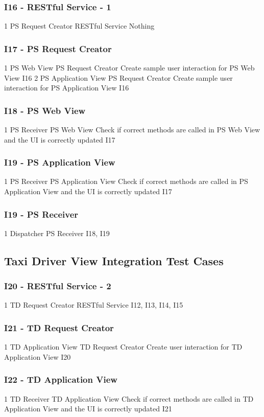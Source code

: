 \subsubsection{I16 - RESTful Service - 1}
\testCaseSimpleSimple
	{1}
	{PS Request Creator}
	{RESTful Service}
	{Nothing}
\subsubsection{I17 - PS Request Creator}
\testCaseSimple
	{1}
	{PS Web View}
	{PS Request Creator}
	{Create sample user interaction for PS Web View}
	{I16}
\testCaseSimple
	{2}
	{PS Application View}
	{PS Request Creator}
	{Create sample user interaction for PS Application View}	
	{I16}
\subsubsection{I18 - PS Web View}
\testCaseSimplee
	{1}
	{PS Receiver}
	{PS Web View}
	{Check if correct methods are called in PS Web View and the UI is correctly updated}
	{I17}
\subsubsection{I19 - PS Application View}
\testCaseSimplee
	{1}
	{PS Receiver}
	{PS Application View}
	{Check if correct methods are called in PS Application View and the UI is correctly updated}
	{I17}
\subsubsection{I19 - PS Receiver}
\testCaseSimpleSimple
	{1}
	{Dispatcher}
	{PS Receiver}
	{I18, I19}
\subsection{Taxi Driver View Integration Test Cases}
\subsubsection{I20 - RESTful Service - 2}
\testCaseSimpleSimple
	{1}
	{TD Request Creator}
	{RESTful Service}
	{I12, I13, I14, I15}
\subsubsection{I21 - TD Request Creator}
\testCaseSimple
	{1}
	{TD Application View}
	{TD Request Creator}
	{Create user interaction for TD Application View}
	{I20}
\subsubsection{I22 - TD Application View}
\testCaseSimplee
	{1}
	{TD Receiver}
	{TD Application View}
	{Check if correct methods are called in TD Application View and the UI is correctly updated}
	{I21}
